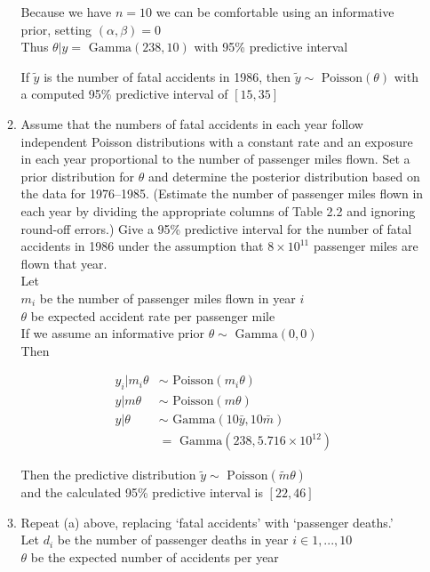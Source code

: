 \documentclass[11pt]{article}
\newcommand{\Gam}{\text{ Gamma}}
\newcommand{\Pois}{\text{ Poisson}}
\theoremstyle{definition}
\theoremstyle{remark}
\theoremstyle{definition}
\begin{document}
\begin{enumerate}
\begin{enumerate}
	Because we have $n=10$ we can be comfortable using an informative prior, setting $(\alpha,\beta)=0$ \\
	Thus $\theta|y = \Gam(238,10)$ with 95\% predictive interval 
	
	If $\tilde y$ is the number of fatal accidents in 1986, then $\tilde y \sim \Pois(\theta)$ with a computed 95\% predictive interval of $[15,35]$\\
	
	\item Assume that the numbers of fatal accidents in each year follow independent Poisson distributions with a constant rate and an exposure in each year proportional to the number of passenger miles flown. Set a prior distribution for $\theta$ and determine the posterior distribution based on the data for 1976–1985. (Estimate the number of passenger miles flown in each year by dividing the appropriate columns of Table 2.2 and ignoring round-off errors.) Give a 95\% predictive interval for the number of fatal accidents in 1986 under the assumption that $8 \times 10^{11}$ passenger miles are flown that year.\\
		
		Let \\
		$m_i$ be the number of passenger miles flown in year $i$\\
		$\theta$ be expected accident rate per passenger mile\\
		If we assume an informative prior $\theta \sim \Gam(0,0)$\\
		Then 
		
		\begin{align*}
		y_i | m_i \theta &\sim \Pois (m_i\theta) \\
		y| m \theta &\sim \Pois (m\theta) \\
		y|\theta &\sim \Gam (10\bar y, 10 \bar m) \\
		&= \Gam (238, 5.716 \times 10^{12} )
		\end{align*}
		
		Then the predictive distribution $\tilde y \sim \Pois (\tilde m\theta)$\\ and the calculated 95\% predictive interval is $[22, 46]$ \\
		 
	\item Repeat (a) above, replacing ‘fatal accidents’ with ‘passenger deaths.’\\
		
	Let $d_i$ be the number of passenger deaths in year $i \in {1,...,10}$\\ $\theta$ be the expected number of accidents per year
	

\end{enumerate}
\end{enumerate}
\end{document}
